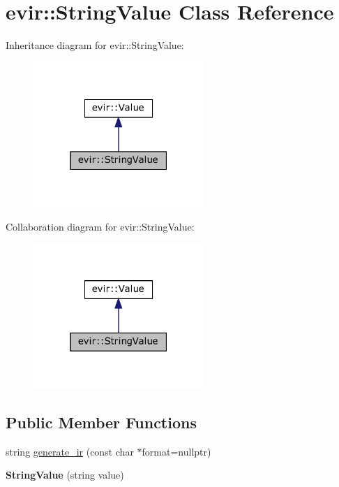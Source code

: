 \hypertarget{classevir_1_1StringValue}{}\section{evir\+:\+:String\+Value Class Reference}
\label{classevir_1_1StringValue}


Inheritance diagram for evir\+:\+:String\+Value\+:
\nopagebreak
\begin{figure}[H]
\begin{center}
\leavevmode
\includegraphics[width=183pt]{classevir_1_1StringValue__inherit__graph}
\end{center}
\end{figure}


Collaboration diagram for evir\+:\+:String\+Value\+:
\nopagebreak
\begin{figure}[H]
\begin{center}
\leavevmode
\includegraphics[width=183pt]{classevir_1_1StringValue__coll__graph}
\end{center}
\end{figure}
\subsection*{Public Member Functions}
\begin{DoxyCompactItemize}
\item 
string \hyperlink{classevir_1_1StringValue_ae635609dfe7acf237b71bdb48625712e}{generate\+\_\+ir} (const char $\ast$format=nullptr)
\item 
\mbox{\label{classevir_1_1StringValue_a91176d5ea0ac4df11329e8a53eff3f21}} 
{\bfseries String\+Value} (string value)
\end{DoxyCompactItemize}
